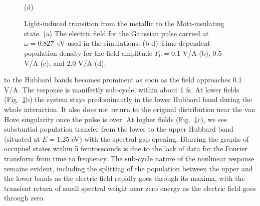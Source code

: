 \begin{figure}[h!]
\begin{minipage}[h]{0.5\linewidth}
\end{minipage}
\hfill
\begin{minipage}[h]{0.5\linewidth}
 \\(d)
\end{minipage}
\caption{Light-induced transition from the metallic to 
the Mott-insulating state. 
(a) The electric field for the Gaussian pulse carried at 
$\omega=0.827$~eV used in the simulations. 
(b-d) Time-dependent population density for 
the field amplitude $F_0=0.1$ V/A (b), 0.5 V/A (c), and 2.0 V/A (d).}
\label{Fig:Light_induced_transition}
\end{figure}
to the Hubbard bands becomes prominent 
as soon as the field approaches 0.1 V/A. 
The response is manifestly sub-cycle, within about 1 fs. 
At lower fields (Fig.~\ref{Fig:Light_induced_transition}b) the system stays predominantly in the lower Hubbard band during the whole interaction. 
It also does not return to the original distribution near the 
van Hove singularity once the pulse is over.
At higher fields (Fig.~\ref{Fig:Light_induced_transition}c), 
we see substantial population transfer from the lower 
to the upper Hubbard band (situated at $E=1.25$ eV) 
with the spectral gap opening. Blurring the graphs of occupied states within 5 femtoseconds is due to the lack of data for the Fourier transform from time to frequency.
The sub-cycle nature of the nonlinear response remains evident, 
including the splitting of the population between the upper and the lower bands as the electric field rapidly goes through its maxima, with the transient return of small spectral weight near zero energy as the electric field goes through zero. 
